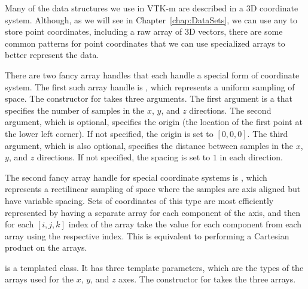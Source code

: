Many of the data structures we use in VTK-m are described in a 3D
coordinate system. Although, as we will see in Chapter~\ref{chap:DataSets},
we can use any  to store point coordinates,
including a raw array of 3D vectors, there are some common patterns for
point coordinates that we can use specialized arrays to better represent
the data.


There are two fancy array handles that each handle a special form of
coordinate system. The first such array handle is
, which represents a uniform
sampling of space. The constructor for
 takes three arguments.
The first argument is a  that specifies the number of samples in
the $x$, $y$, and $z$ directions. The second argument, which is optional,
specifies the origin (the location of the first point at the lower left
corner). If not specified, the origin is set to $[0,0,0]$. The third
argument, which is also optional, specifies the distance between samples in
the $x$, $y$, and $z$ directions. If not specified, the spacing is set to
$1$ in each direction.




The second fancy array handle for special coordinate systems is
, which represents a rectilinear
sampling of space where the samples are axis aligned but have variable
spacing. Sets of coordinates of this type are most efficiently represented
by having a separate array for each component of the axis, and then for
each $[i,j,k]$ index of the array take the value for each component from
each array using the respective index. This is equivalent to performing a
Cartesian product on the arrays.

 is a templated class. It has
three template parameters, which are the types of the arrays used for the
$x$, $y$, and $z$ axes. The constructor for
 takes the three arrays.

